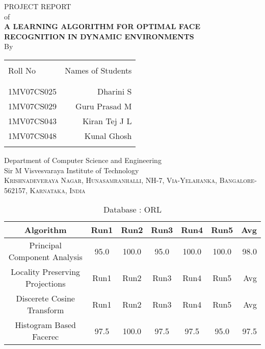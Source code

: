 \documentclass[10pt,a4paper]{article}
\begin{document}
\begin{center}

\textup{\Large PROJECT REPORT }\\[0.5cm]
\textup{\Large of }\\[0.5cm]


\uppercase{\Large \textbf {A Learning Algorithm for Optimal Face Recognition in Dynamic Environments}}\\[3.0cm]

\vspace{1.0cm}
\normalsize By \\
\begin{table}[h]
\centering
\begin{tabular}{lr}\hline \\
Roll No & Names of Students \\ \\ \hline
\\
1MV07CS025 & Dharini S \\
1MV07CS029 & Guru Prasad M \\
1MV07CS043 & Kiran Tej J L \\
1MV07CS048 & Kunal Ghosh \\ \\ \hline 
\end{tabular}
\end{table}

\vfill

\normalsize

\Large{Department of Computer Science and Engineering}\\
\LARGE{Sir M Visvesvaraya Institute of Technology }\\
\normalsize
\textsc{Krishnadeveraya Nagar, Hunasamranhalli, NH-7,
Via-Yelahanka, Bangalore-562157, Karnataka, India}\\

\vspace{0.5cm}

\newpage

\begin{table}
\caption{Database : ORL}
\centering
\begin{tabular}{| c | c | c | c | c | c | r | } \hline 
Algorithm & Run1 & Run2 & Run3 & Run4 & Run5 & Avg  \\  
\hline
Principal Component Analysis & 95.0 & 100.0 & 95.0 & 100.0 & 100.0 & 98.0 \\
\hline
Locality Preserving Projections & Run1 & Run2 & Run3 & Run4 & Run5 & Avg \\
\hline
Discerete Cosine Transform & Run1 & Run2 & Run3 & Run4 & Run5 & Avg \\
\hline
Histogram Based Facerec & 97.5 & 100.0 & 97.5 & 97.5 & 95.0 & 97.5 \\
\hline
\end{tabular}
\end{table}



\end{center}
\end{document}
